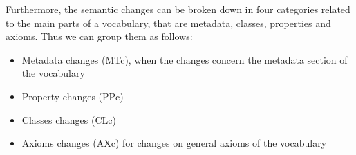 Furthermore, the semantic changes can be broken down in four categories related to the main parts of a vocabulary, that are metadata, classes, properties and axioms. Thus we can group them as follows:

\begin{itemize}
\item Metadata changes (MTc), when the changes concern the metadata section of the vocabulary
\item Property changes (PPc) 
\item Classes changes (CLc) 
\item Axioms changes (AXc) for changes on general axioms of the vocabulary

\end{itemize}
  


